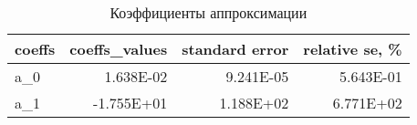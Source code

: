 \begin{table}[H]
\centering
\caption{Коэффициенты аппроксимации}
\label{coeffs_table}
\begin{tabular}{lrrr}
\toprule
coeffs &  coeffs\_values &  standard error &  relative se, \% \\
\midrule
   a\_0 &      1.638E-02 &       9.241E-05 &       5.643E-01 \\
   a\_1 &     -1.755E+01 &       1.188E+02 &       6.771E+02 \\
\bottomrule
\end{tabular}
\end{table}
